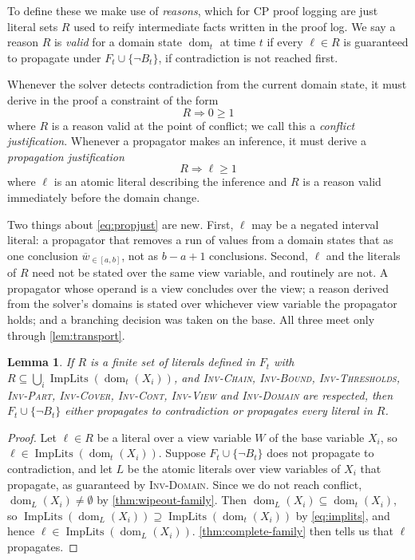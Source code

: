 \documentclass[11pt,a4paper]{article}
\theoremstyle{plain}
\newtheorem{lemmaT}{Lemma}
\theoremstyle{definition}
\theoremstyle{remark}
\newcommand{\fname}[1]{\ensuremath{\operatorname{#1}}}
\newcommand{\dm}{\fname{dom}}
\newcommand{\ImpLits}{\fname{ImpLits}}
\newcommand{\natin}[3]{\overline{#1}_{\in[#2,#3]}}
\newcommand{\inv}[1]{\textnormal{\textsc{Inv-#1}}}
\newcommand{\invChain}{\inv{Chain}}
\newcommand{\invThresholds}{\inv{Thresholds}}
\newcommand{\invPart}{\inv{Part}}
\newcommand{\invCover}{\inv{Cover}}
\newcommand{\invCont}{\inv{Cont}}
\newcommand{\invView}{\inv{View}}
\newcommand{\invDomain}{\inv{Domain}}
\begin{document}
To define these we make use of \emph{reasons}, which for CP proof logging are
just literal sets $R$ used to reify intermediate facts written in the proof log.
We say a reason $R$ is \emph{valid} for a domain state $\dm_t$ at time $t$ if
every $\ell\in R$ is guaranteed to propagate under $F_t\cup\{\neg B_t\}$, if
contradiction is not reached first.

Whenever the solver detects contradiction from the current domain state, it must
derive in the proof a constraint of the form
\begin{equation}
  R \Rightarrow 0\geq 1
  \label{eq:conflictjust}
\end{equation}
where $R$ is a reason valid at the point of conflict; we call this a
\emph{conflict justification}.  Whenever a propagator makes an inference, it
must derive a \emph{propagation justification}
\begin{equation}
  R \Rightarrow \ell \geq 1
  \label{eq:propjust}
\end{equation}
where $\ell$ is an atomic literal describing the inference and $R$ is a reason
valid immediately before the domain change.

Two things about \cref{eq:propjust} are new.  First, $\ell$ may be a negated
interval literal: a propagator that removes a run of values from a domain states
that as one conclusion $\natin{w}{a}{b}$, not as $b-a+1$ conclusions.
Second, $\ell$ and the literals of $R$ need not be stated over the same
view variable, and routinely are not.  A propagator whose operand is a view
concludes over the view; a reason derived from the solver's domains is stated
over whichever view variable the propagator holds; and a branching decision was
taken on the base.  All three meet only through \cref{lem:transport}.

\begin{lemmaT}
\label{lem:reasons}
If $R$ is a finite set of literals defined in $F_t$ with
$R\subseteq\bigcup_i\ImpLits(\dm_t(X_i))$, and \invChain{}, \inv{Bound},
\invThresholds{}, \invPart{}, \invCover{}, \invCont{}, \invView{} and \invDomain{} are
respected, then $F_t\cup\{\neg B_t\}$ either propagates to contradiction or
propagates every literal in $R$.
\end{lemmaT}

\begin{proof}
Let $\ell\in R$ be a literal over a view variable $W$ of the base variable
$X_i$, so $\ell\in\ImpLits(\dm_t(X_i))$.  Suppose $F_t\cup\{\neg B_t\}$ does not
propagate to contradiction, and let $L$ be the atomic literals over
view variables of $X_i$ that propagate, as guaranteed by \invDomain{}.  Since
we do not reach conflict, $\dm_L(X_i)\neq\emptyset$ by
\cref{thm:wipeout-family}.  Then $\dm_L(X_i)\subseteq\dm_t(X_i)$, so
$\ImpLits(\dm_L(X_i))\supseteq\ImpLits(\dm_t(X_i))$ by \cref{eq:implits}, and
hence $\ell\in\ImpLits(\dm_L(X_i))$.  \cref{thm:complete-family} then tells us
that $\ell$ propagates.
\end{proof}
\end{document}

